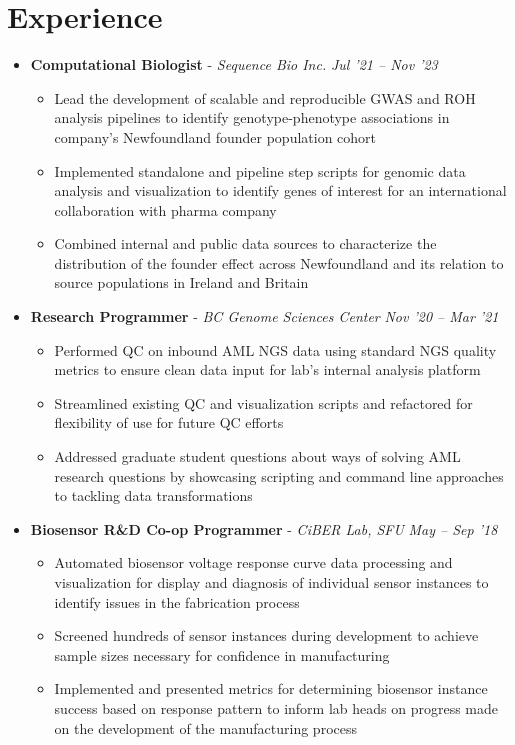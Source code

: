 \documentclass{article}
\newcommand{\experienceheader}[3]{\item \textbf{#1} - \textit{#2} \hfill \textit{#3} \vspace{-.2em}}
\newcommand{\customsection}[1]{\section*{#1} \vspace{-1em} \hrulefill \vspace{-.5em}}
\begin{document}
\customsection{Experience}
\begin{itemize}
  \experienceheader{Computational Biologist}{Sequence Bio Inc.}{Jul '21 -- Nov '23}
    \begin{itemize}
      \item Lead the development of scalable and reproducible GWAS and ROH analysis pipelines to identify genotype-phenotype associations in company's Newfoundland founder population cohort
      \item Implemented standalone and pipeline step scripts for genomic data analysis and visualization to identify genes of interest for an international collaboration with pharma company
      \item Combined internal and public data sources to characterize the distribution of the founder effect across Newfoundland and its relation to source populations in Ireland and Britain
    \end{itemize}
  \experienceheader{Research Programmer}{BC Genome Sciences Center}{Nov '20 -- Mar '21}
    \begin{itemize}
      \item Performed QC on inbound AML NGS data using standard NGS quality metrics to ensure clean data input for lab's internal analysis platform
      \item Streamlined existing QC and visualization scripts and refactored for flexibility of use for future QC efforts
      \item Addressed graduate student questions about ways of solving AML research questions by showcasing scripting and command line approaches to tackling data transformations 
    \end{itemize}
  \experienceheader{Biosensor R\&D Co-op Programmer}{CiBER Lab, SFU}{May -- Sep '18}
    \begin{itemize}
      \item Automated biosensor voltage response curve data processing and visualization for display and diagnosis of individual sensor instances to identify issues in the fabrication process
      \item Screened hundreds of sensor instances during development to achieve sample sizes necessary for confidence in manufacturing 
      \item Implemented and presented metrics for determining biosensor instance success based on response pattern to inform lab heads on progress made on the development of the manufacturing process
    \end{itemize}

\end{itemize}
\end{document}
